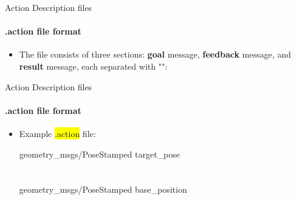 \documentclass{beamer}
\begin{document}
\begin{frame}{Action Description files}
    \framesubtitle{.action file format}
    \begin{itemize}
        \item The file consists of three sections: \textbf{goal} message, \textbf{feedback} message, and \textbf{result} message, each separated with "\ttfamily{\textemdash\textemdash\textemdash}":
        
        \vspace{3mm}
        
        \begin{focus}
        \end{focus}
    \end{itemize}     
\end{frame}

\begin{frame}{Action Description files}
    \framesubtitle{.action file format}
    \begin{itemize}
        \item Example {\ttfamily \colorbox{yellow}{.action}} file:
        \begin{focus}
            \ttfamily
            geometry\_msgs/PoseStamped  \hspace{0.5cm} target\_pose\\
            \textemdash \textemdash \textemdash \\
            \textemdash \textemdash \textemdash \\
            geometry\_msgs/PoseStamped  \hspace{0.5cm} base\_position\\
        \end{focus} 
    \end{itemize}      
\end{frame}
\end{document}
